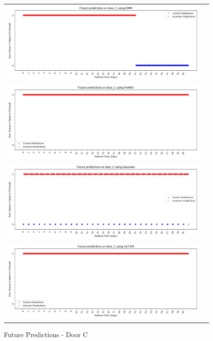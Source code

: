 \begin{center}
\begin{figure}[!Hp]
  \begin{tabular}{cc}
    {\includegraphics[width = 6in]{images/results/Future_door_C_DMM.png}} \\
    {\includegraphics[width = 6in]{images/results/Future_door_C_FreMEn.png}} \\
    {\includegraphics[width = 6in]{images/results/Future_door_C_Gaussian.png}} \\
    {\includegraphics[width = 6in]{images/results/Future_door_C_HyT-EM.png}} \\
  \end{tabular}
  \caption{Future Predictions - Door C}
  \label{figure:future_door_C}
\end{figure}\\ \\


\end{center}
